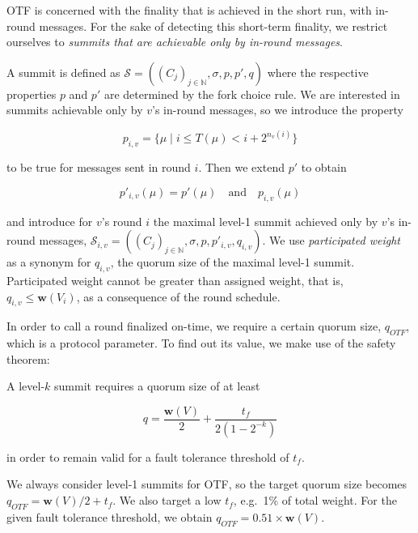 

OTF is concerned with the finality that is achieved in the short run, with in-round messages. For the sake of detecting this short-term finality, we restrict ourselves to \emph{summits that are achievable only by in-round messages}.

A summit is defined as $\mathcal{S}=((C_j)_{j\in\mathbb{N}}, \sigma,p,p',q)$ where the respective properties $p$ and $p'$ are determined by the fork choice rule. We are interested in summits achievable only by $v$'s in-round messages, so we introduce the property

\begin{equation}
  p_{i,v} = \{\mu \mid i \leq T(\mu)< i+2^{n_v(i)}\}
\end{equation}

to be true for messages sent in round $i$. Then we extend $p'$ to obtain

\begin{equation}
  p'_{i,v}(\mu) = p'(\mu)\quad\text{and}\quad p_{i,v}(\mu)
\end{equation}

and introduce for $v$'s round $i$ the maximal level-1 summit achieved only by $v$'s in-round messages, $\mathcal{S}_{i,v}=((C_j)_{j\in\mathbb{N}}, \sigma,p,p'_{i,v},q_{i,v})$. We use \emph{participated weight} as a synonym for $q_{i,v}$, the quorum size of the maximal level-1 summit. Participated weight cannot be greater than assigned weight, that is, $q_{i,v} \leq \boldsymbol{w}(V_i)$, as a consequence of the round schedule.

In order to call a round finalized on-time, we require a certain quorum size, $q_{OTF}$, which is a protocol parameter. To find out its value, we make use of the safety theorem:

\begin{theorem}
  A level-$k$ summit requires a quorum size of at least

  \begin{equation}
    q = \frac{\boldsymbol{w}(V)}{2} + \frac{t_f}{2(1-2^{-k})}
  \end{equation}

  in order to remain valid for a fault tolerance threshold of $t_f$.
\end{theorem}

We always consider level-1 summits for OTF, so the target quorum size becomes $q_{OTF}=\boldsymbol{w}(V)/2+t_f$. We also target a low $t_f$, e.g.~1\% of total weight. For the given fault tolerance threshold, we obtain $q_{OTF} = 0.51 \times \boldsymbol{w}(V)$.

